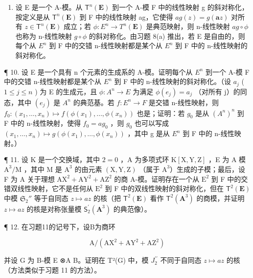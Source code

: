 \begin{enumerate}
\def\labelenumi{\arabic{enumi}.}
\setcounter{enumi}{8}
\tightlist
\item
  设 E 是一个 A-模。从 \(\mathsf{T}^{n}(\mathbf{E})\) 到一个 A-模 F 中的线性映射 g 的斜对称化，按定义是从 \(\mathsf{T}^{n}(\mathbf{E})\) 到 F 中的线性映射 ag，它使得 \(ag(z) = g(\boldsymbol{a}z)\) 对所有 \(z \in \mathsf{T}^{n}(\mathbf{E})\) 成立；若 \(\phi: E^{n} \to T^{n}(\mathbf{E})\) 是典范映射，则 n-线性映射 \(ag \circ \phi\) 也称为 n-线性映射 \(g \circ \phi\) 的斜对称化。由习题 8(a) 推出，若 E 是自由的，则每个从 \(E^{n}\) 到 F 中的交错 n-线性映射都是某个从 \(E^{n}\) 到 F 中的 n-线性映射的斜对称化。
\end{enumerate}

¶ 10. 设 E 是一个具有 n 个元素的生成系的 A-模。证明每个从 \(E^{n}\) 到一个 A-模 F 中的交错 n-线性映射都是某个从 \(E^{n}\) 到 F 中的 n-线性映射的斜对称化。（设 \(a_{j}\) ( \(1 \leqslant j \leqslant n\) ) 为 E 的生成元，且 \(\phi: A^{n} \rightarrow E\) 为满足 \(\phi(e_{j}) = a_{j}\) （对所有 j）的同态，其中 \((e_{j})\) 是 \(A^{n}\) 的典范基。若 \(f: E^{n} \rightarrow F\) 是交错 n-线性映射，则 \(f_{0}: (x_{1}, \ldots, x_{n}) \mapsto f(\phi(x_{1}), \ldots, \phi(x_{n}))\) 也是；证明：若 \(g_{0}\) 是从 \((A^{n})^{n}\) 到 F 中的 n-线性映射，使得 \(f_{0} = a g_{0}\) ，则 \(g_{0}\) 也可以写成 \((x_{1}, \ldots, x_{n}) \mapsto g(\phi(x_{1}), \ldots, \phi(x_{n}))\) ，其中 g 是从 \(E^{n}\) 到 F 中的 n-线性映射。）

¶ 11. 设 K 是一个交换域，其中 \(2 = 0\) ，A 为多项式环 \(\mathrm{K}[\mathrm{X}, \mathrm{Y}, \mathrm{Z}]\) ，E 为 A 模 \(\mathrm{A}^3/\mathrm{M}\) ，其中 M 是 \(\mathrm{A}^3\) 的由元素 \((\mathrm{X}, \mathrm{Y}, \mathrm{Z})\) （属于 \(\mathrm{A}^3\)）生成的子模；最后，设 F 为 A 关于理想 \(\mathrm{AX}^2 + \mathrm{AY}^2 + \mathrm{AZ}^2\) 的商 A-模。证明存在一个从 \(\mathrm{E}^2\) 到 F 中的交错双线性映射，它不是任何从 \(\mathrm{E}^2\) 到 F 中的双线性映射的斜对称化，但在 \(\mathsf{T}^2(\mathbf{E})\) 中模 \(\mathfrak{S}_2''\) 等于自同态 \(z \mapsto az\) 的核（把 \(\mathsf{T}^2(\mathbf{E})\) 看作 \(\mathsf{T}^2 (\mathbf{A}^3)\) 的商模，并证明 \(z\mapsto az\) 的核是对称张量模 \(\mathsf{S}_2^{\prime}(\mathbf{A}^3)\) 的典范像）。

¶ 12. 在习题11的记号下，设B为商环

\[
\mathrm{A} / (\mathrm{AX} ^ {2} + \mathrm{AY} ^ {2} + \mathrm{AZ} ^ {2})
\]

并设 G 为 B-模 E ⊗A B。证明在 T²(G) 中，模 \(J_{2}^{\prime\prime}\) 不同于自同态 \(z \mapsto az\) 的核（方法类似于习题 11 的方法）。

